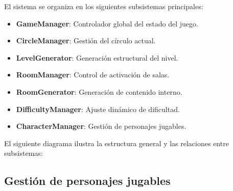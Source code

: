 El sistema se organiza en los siguientes subsistemas principales:

\begin{itemize}
    \item \textbf{GameManager}: Controlador global del estado del juego.
    \item \textbf{CircleManager}: Gestión del círculo actual.
    \item \textbf{LevelGenerator}: Generación estructural del nivel.
    \item \textbf{RoomManager}: Control de activación de salas.
    \item \textbf{RoomGenerator}: Generación de contenido interno.
    \item \textbf{DifficultyManager}: Ajuste dinámico de dificultad.
    \item \textbf{CharacterManager}: Gestión de personajes jugables.
\end{itemize}

El siguiente diagrama ilustra la estructura general y las relaciones entre subsistemas:

\begin{center}
\end{center}

\subsection{Gestión de personajes jugables}

